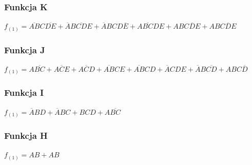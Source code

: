 \documentclass[a4paper]{article}
\begin{document}

\subsubsection{Funkcja K}
\begin{center}
  $f_{(1)} = 
  {\overline{AB}C\overline{DE}} +
  {\overline{A}B\overline{CD}E} +
  {\overline{A}BCD\overline{E}} +
  {A\overline{BC}DE} +
  {AB\overline{CDE}} +
  {ABC\overline{D}E} $
\end{center}


\subsubsection{Funkcja J}
\begin{center}
  $f_{(1)} = 
  {A\overline{BC}} +
  {A\overline{C}E} +
  {A\overline{C}D} +
  {\overline{AB}CE} +
  {\overline{AB}CD} +
  {\overline{A}CDE} +
  {\overline{A}B\overline{CD}} +
  {ABC\overline{D}} $
\end{center}


\subsubsection{Funkcja I}
\begin{center}
  $f_{(1)} = 
  {\overline{A}BD} +
  {\overline{A}BC} +
  {BCD} +
  {A\overline{BC}} $
\end{center}


\subsubsection{Funkcja H}
\begin{center}
  $f_{(1)} = {AB} + {AB} $
\end{center}
\end{document}
